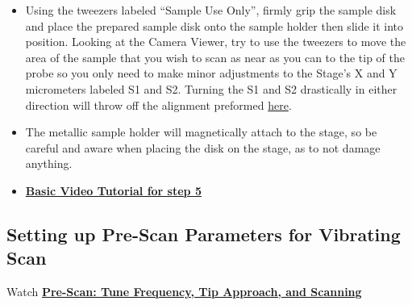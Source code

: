 \documentclass{../lab}
\begin{document}
\begin{itemize}
    \item Using the tweezers labeled ``Sample Use Only'', firmly grip the sample disk and place the prepared sample disk onto the sample holder then slide it into position.  Looking at the Camera Viewer, try to use the tweezers to move the area of the sample that you wish to scan as near as you can to the tip of the probe so you only need to make minor adjustments to the Stage's X and Y micrometers labeled S1 and S2.  Turning the S1 and S2 drastically in either direction will throw off the alignment preformed \hyperref[sec:Alignment]{here}.
    
    \item The metallic sample holder will magnetically attach to the stage, so be careful and aware when placing the disk on the stage, as to not damage anything.

    \item \href{http://experimentationlab.berkeley.edu/sites/default/files/AFMImages/3.0\%20Sample\%20Exchange\%28V1.0\%29.wmv}{\textbf{Basic Video Tutorial for step 5}}
\end{itemize}

\subsection{Setting up Pre-Scan Parameters for Vibrating Scan}
\label{subsec:SettingUpPreScanParametersForVibratingScan}

Watch \href{http://experimentationlab.berkeley.edu/sites/default/files/prescan\_final2.mp4}{\textbf{Pre-Scan: Tune Frequency, Tip Approach, and Scanning}}
\end{document}
